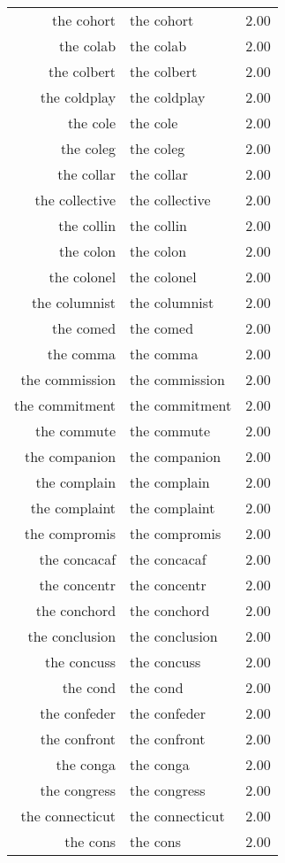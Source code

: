 \begin{table}[ht]
\begin{tabular}{rlr}
  the cohort & the cohort & 2.00 \\ 
  the colab & the colab & 2.00 \\ 
  the colbert & the colbert & 2.00 \\ 
  the coldplay & the coldplay & 2.00 \\ 
  the cole & the cole & 2.00 \\ 
  the coleg & the coleg & 2.00 \\ 
  the collar & the collar & 2.00 \\ 
  the collective & the collective & 2.00 \\ 
  the collin & the collin & 2.00 \\ 
  the colon & the colon & 2.00 \\ 
  the colonel & the colonel & 2.00 \\ 
  the columnist & the columnist & 2.00 \\ 
  the comed & the comed & 2.00 \\ 
  the comma & the comma & 2.00 \\ 
  the commission & the commission & 2.00 \\ 
  the commitment & the commitment & 2.00 \\ 
  the commute & the commute & 2.00 \\ 
  the companion & the companion & 2.00 \\ 
  the complain & the complain & 2.00 \\ 
  the complaint & the complaint & 2.00 \\ 
  the compromis & the compromis & 2.00 \\ 
  the concacaf & the concacaf & 2.00 \\ 
  the concentr & the concentr & 2.00 \\ 
  the conchord & the conchord & 2.00 \\ 
  the conclusion & the conclusion & 2.00 \\ 
  the concuss & the concuss & 2.00 \\ 
  the cond & the cond & 2.00 \\ 
  the confeder & the confeder & 2.00 \\ 
  the confront & the confront & 2.00 \\ 
  the conga & the conga & 2.00 \\ 
  the congress & the congress & 2.00 \\ 
  the connecticut & the connecticut & 2.00 \\ 
  the cons & the cons & 2.00 \\ 

\end{tabular}
\end{table}
